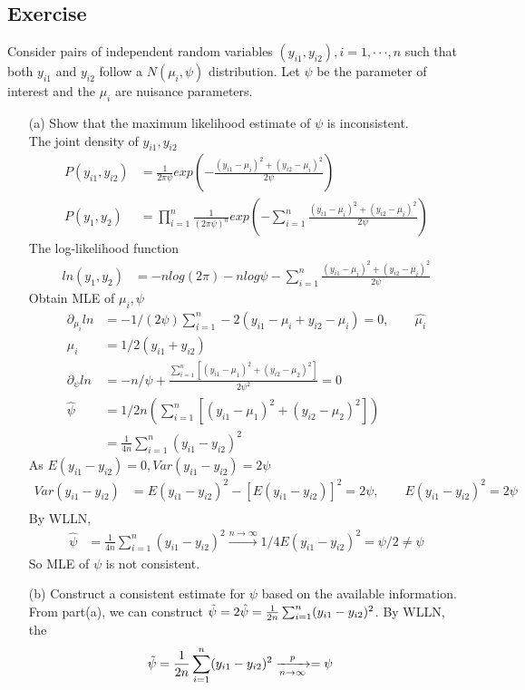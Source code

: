 \documentclass[11pt]{article} %
\begin{document}
\subsection{Exercise}
Consider pairs of independent random variables $(y_{i1}, y_{i2}), i = 1, · · · , n$ such that both $y_{i1}$ and $y_{i2}$ follow a $N(\mu_i, \psi)$ distribution. Let $\psi$ be the parameter of interest and the $\mu_i$ are nuisance parameters.
\begin{itemize}
	\item [(a)] Show that the maximum likelihood estimate of $\psi$ is inconsistent.\\
	The joint density of $y_{i1}, y_{i2}$
	\begin{align*}
		P(y_{i1}, y_{i2}) &= \frac{1}{2\pi \psi} exp \left(-\frac{(y_{i1}-\mu_i)^2 + (y_{i2}-\mu_i)^2}{2 \psi} \right)\\
		P(y_{1}, y_{2}) &=\prod_{i=1}^n \frac{1}{(2\pi \psi)^n} exp \left(- \sum_{i=1}^n  \frac{(y_{i1}-\mu_i)^2 + (y_{i2}-\mu_i)^2}{2 \psi} \right)
	\end{align*}
	The log-likelihood function
	\begin{align*}
		ln(y_{1}, y_{2}) &= -n log(2\pi) - nlog\psi -\sum_{i=1}^n  \frac{(y_{i1}-\mu_i)^2 + (y_{i2}-\mu_i)^2}{2 \psi} 
	\end{align*}
	Obtain MLE of $\mu_i, \psi$  
	\begin{align*}
		\partial_{\mu_i}ln  &=-1/(2\psi) \sum_{i=1}^n -2 (y_{i1} - \mu_i + y_{i2} - \mu_i)= 0, \qquad \hat{\mu_i} \\
		\mu_i &= 1/2 (y_{i1}+ y_{i2})\\
		\partial_{\psi}ln  &= -n/\psi +  \frac{\sum_{i=1}^n  [(y_{i1}-\mu_1)^2 + (y_{i2}-\mu_2)^2]}{2\psi^2} = 0\\
		\hat{\psi} &= 1/2n \left( \sum_{i=1}^n  [(y_{i1}-\mu_1)^2 + (y_{i2}-\mu_2)^2] \right) \\
		&= \frac{1}{4n} \sum_{i=1}^n  (y_{i1}-y_{i2})^2
	\end{align*}
	As $E(y_{i1} - y_{i2}) = 0, Var(y_{i1} - y_{i2}) = 2\psi $
	\begin{align*}
		Var(y_{i1} - y_{i2}) &=  E(y_{i1} - y_{i2})^2 - [E(y_{i1} - y_{i2})]^2 = 2\psi, \qquad  E(y_{i1} - y_{i2})^2 = 2\psi\\
	\end{align*}
	By WLLN, 
	\begin{align*}
		\hat{\psi} &= \frac{1}{4n} \sum_{i=1}^n  (y_{i1}-y_{i2})^2 \xrightarrow{n \rightarrow \infty}  1/4 E(y_{i1} - y_{i2})^2 = \psi/2 \neq \psi
	\end{align*}
	So MLE of $\psi$ is not consistent.
	\item[(b)]  Construct a consistent estimate for $\psi$ based on the available information.\\
	From part(a), we can construct $\Tilde{\psi} = 2\hat{\psi} = \frac{1}{2n} \sum_{i=1}^n  (y_{i1}-y_{i2})^2$.
	By WLLN, the
	\begin{align*}
		\Tilde{\psi} &= \frac{1}{2n} \sum_{i=1}^n  (y_{i1}-y_{i2})^2 \xrightarrow[n \rightarrow \infty]{p} = \psi
	\end{align*}   
	

\end{itemize}
\end{document}
